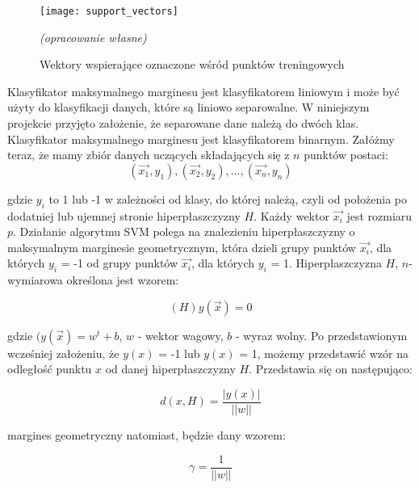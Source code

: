 \documentclass[[10pt,a4paper]{article}
\begin{document}
\begin{figure}[h]
\centering
\texttt{[image: support\_vectors]}\\
\caption{Wektory wspierające oznaczone wśród punktów treningowych }
\textit{(opracowanie własne)}
\end{figure}

Klasyfikator maksymalnego marginesu jest klasyfikatorem liniowym i może być użyty do klasyfikacji danych, które są liniowo separowalne. W niniejszym projekcie przyjęto założenie, że separowane dane należą do dwóch klas. Klasyfikator maksymalnego marginesu jest klasyfikatorem binarnym.
Załóżmy teraz, że mamy zbiór danych uczących składających się z $n$ punktów postaci:
\newpage
\begin{equation}
 (\overrightarrow{x_1}, y_1),(\overrightarrow{x_2}, y_2),...,(\overrightarrow{x_n}, y_n)
\end{equation}

\vspace{5mm}
gdzie $y_i$ to 1 lub -1 w zależności od klasy, do której należą, czyli od położenia po dodatniej lub ujemnej stronie hiperpłaszczyzny $H$. Każdy wektor $\overrightarrow{x_i}$ jest rozmiaru $p$. Działanie algorytmu SVM polega na znalezieniu hiperpłaszczyzny  o maksymalnym marginesie geometrycznym, która dzieli grupy punktów $\overrightarrow{x_i}$, dla których $y_i$ = -1 od grupy punktów  $\overrightarrow{x_i}$, dla których $y_i$ = 1.
Hiperpłaszczyzna $H$, $n$-wymiarowa określona jest wzorem:

\vspace{5mm}
\begin{equation}
(H)y(\overrightarrow{x}) = 0
\end{equation}

\vspace{5mm}
gdzie $(y(\overrightarrow{x}) = w^t + b$, $w$ - wektor wagowy, $b$ - wyraz wolny. 
Po przedstawionym wcześniej założeniu, że $y(x)$ = -1 lub $y(x)$ = 1, możemy przedstawić wzór na odległość punktu $x$ od danej hiperpłaszczyzny $H$. Przedstawia się on następująco:

\vspace{5mm}
\begin{equation}
d(x,H) = \frac{|y(x)|}{||w||}
\end{equation}

\vspace{5mm}margines geometryczny natomiast, będzie dany wzorem:

\vspace{5mm}
\begin{equation}
\gamma = \frac{1}{||w||}
\end{equation}
\end{document}
